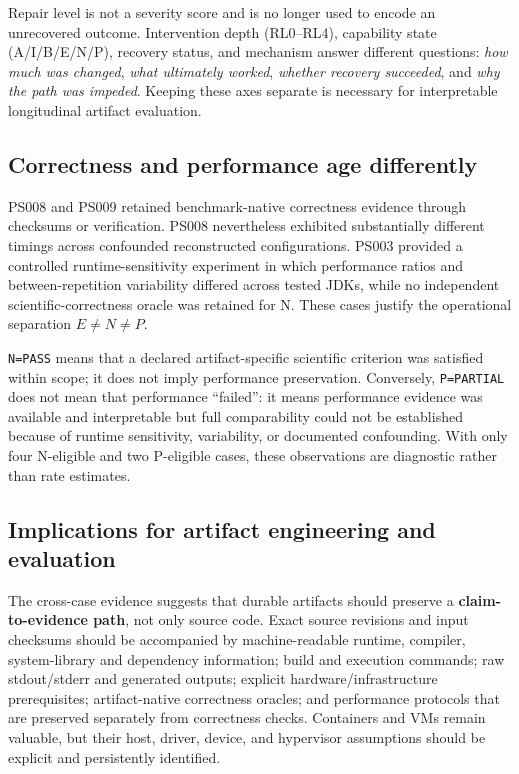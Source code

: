 \documentclass[a4paper,fleqn]{cas-dc}
\begin{document}
Repair level is not a severity score and is no longer used to encode an unrecovered outcome. Intervention depth (RL0--RL4), capability state (A/I/B/E/N/P), recovery status, and mechanism answer different questions: \emph{how much was changed}, \emph{what ultimately worked}, \emph{whether recovery succeeded}, and \emph{why the path was impeded}. Keeping these axes separate is necessary for interpretable longitudinal artifact evaluation.

\subsection{Correctness and performance age differently}

PS008 and PS009 retained benchmark-native correctness evidence through checksums or verification. PS008 nevertheless exhibited substantially different timings across confounded reconstructed configurations. PS003 provided a controlled runtime-sensitivity experiment in which performance ratios and between-repetition variability differed across tested JDKs, while no independent scientific-correctness oracle was retained for N. These cases justify the operational separation \(E\neq N\neq P\).

\texttt{N=PASS} means that a declared artifact-specific scientific criterion was satisfied within scope; it does not imply performance preservation. Conversely, \texttt{P=PARTIAL} does not mean that performance ``failed'': it means performance evidence was available and interpretable but full comparability could not be established because of runtime sensitivity, variability, or documented confounding. With only four N-eligible and two P-eligible cases, these observations are diagnostic rather than rate estimates.

\subsection{Implications for artifact engineering and evaluation}

The cross-case evidence suggests that durable artifacts should preserve a \textbf{claim-to-evidence path}, not only source code. Exact source revisions and input checksums should be accompanied by machine-readable runtime, compiler, system-library and dependency information; build and execution commands; raw stdout/stderr and generated outputs; explicit hardware/infrastructure prerequisites; artifact-native correctness oracles; and performance protocols that are preserved separately from correctness checks. Containers and VMs remain valuable, but their host, driver, device, and hypervisor assumptions should be explicit and persistently identified.
\end{document}
